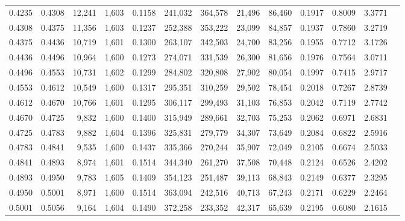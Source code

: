 \begin{tabular}{rrrrrrrrrrrrr}
0.4235 & 0.4308 & 12,241 & 1,603 &                                     0.1158 & 241,032 & 364,578 &  21,496 &  86,460 & 0.1917 & 0.8009 & 3.3771 \\
0.4308 & 0.4375 & 11,356 & 1,603 &                                     0.1237 & 252,388 & 353,222 &  23,099 &  84,857 & 0.1937 & 0.7860 & 3.2719 \\
0.4375 & 0.4436 & 10,719 & 1,601 &                                     0.1300 & 263,107 & 342,503 &  24,700 &  83,256 & 0.1955 & 0.7712 & 3.1726 \\
0.4436 & 0.4496 & 10,964 & 1,600 &                                     0.1273 & 274,071 & 331,539 &  26,300 &  81,656 & 0.1976 & 0.7564 & 3.0711 \\
0.4496 & 0.4553 & 10,731 & 1,602 &                                     0.1299 & 284,802 & 320,808 &  27,902 &  80,054 & 0.1997 & 0.7415 & 2.9717 \\
0.4553 & 0.4612 & 10,549 & 1,600 &                                     0.1317 & 295,351 & 310,259 &  29,502 &  78,454 & 0.2018 & 0.7267 & 2.8739 \\
0.4612 & 0.4670 & 10,766 & 1,601 &                                     0.1295 & 306,117 & 299,493 &  31,103 &  76,853 & 0.2042 & 0.7119 & 2.7742 \\
0.4670 & 0.4725 &  9,832 & 1,600 &                                     0.1400 & 315,949 & 289,661 &  32,703 &  75,253 & 0.2062 & 0.6971 & 2.6831 \\
0.4725 & 0.4783 &  9,882 & 1,604 &                                     0.1396 & 325,831 & 279,779 &  34,307 &  73,649 & 0.2084 & 0.6822 & 2.5916 \\
0.4783 & 0.4841 &  9,535 & 1,600 &                                     0.1437 & 335,366 & 270,244 &  35,907 &  72,049 & 0.2105 & 0.6674 & 2.5033 \\
0.4841 & 0.4893 &  8,974 & 1,601 &                                     0.1514 & 344,340 & 261,270 &  37,508 &  70,448 & 0.2124 & 0.6526 & 2.4202 \\
0.4893 & 0.4950 &  9,783 & 1,605 &                                     0.1409 & 354,123 & 251,487 &  39,113 &  68,843 & 0.2149 & 0.6377 & 2.3295 \\
0.4950 & 0.5001 &  8,971 & 1,600 &                                     0.1514 & 363,094 & 242,516 &  40,713 &  67,243 & 0.2171 & 0.6229 & 2.2464 \\
0.5001 & 0.5056 &  9,164 & 1,604 &                                     0.1490 & 372,258 & 233,352 &  42,317 &  65,639 & 0.2195 & 0.6080 & 2.1615 \\

\end{tabular}
